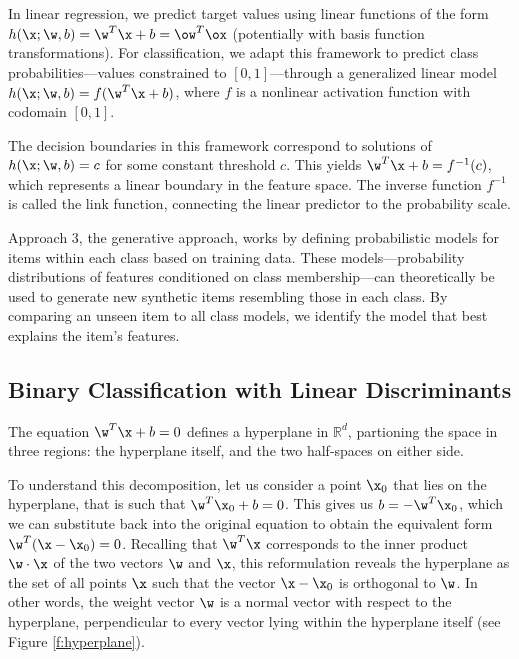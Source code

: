 In linear regression, we predict target values using linear functions of the form $h(\x;\w,b)=\w^T\x+b=\ow^T\ox$ (potentially with basis function transformations). For classification, we adapt this framework to predict class probabilities—values constrained to $[0,1]$—through a \alert{generalized linear model} $h(\x;\w,b)=f(\w^T\x+b)$, where $f$ is a nonlinear \alert{activation function} with codomain $[0,1]$.

The decision boundaries in this framework correspond to solutions of $h(\x;\w,b)=c$ for some constant threshold $c$. This yields $\w^T\x+b=f^{-1}(c)$, which represents a linear boundary in the feature space. The inverse function $f^{-1}$ is called the \alert{link function}, connecting the linear predictor to the probability scale.

Approach 3, the \alert{generative} approach, works by defining probabilistic models for items within each class based on training data. These models—probability distributions of features conditioned on class membership—can theoretically be used to generate new synthetic items resembling those in each class. By comparing an unseen item to all class models, we identify the model that best explains the item's features.


\subsection*{Binary Classification with Linear Discriminants}

The equation $\w^T\x + b = 0$ defines a hyperplane in $\mathbb{R}^d$, partioning the space in three regions: the hyperplane itself, and the two half-spaces on either side.

To understand this decomposition, let us consider a point $\x_0$ that lies on the hyperplane, that is such that $\w^T\x_0 + b = 0$. This gives us $b = -\w^T\x_0$, which we can substitute back into the original equation to obtain the equivalent form $\w^T(\x - \x_0) = 0$. Recalling that $\w^T\x$ corresponds to the inner product $\w\cdot\x$ of the two vectors $\w$ and $\x$, this reformulation reveals the hyperplane as the set of all points $\x$ such that the vector $\x - \x_0$ is orthogonal to $\w$. In other words, the weight vector $\w$ is a normal vector with respect to the hyperplane, perpendicular to every vector lying within the hyperplane itself (see Figure \ref{f:hyperplane}).


